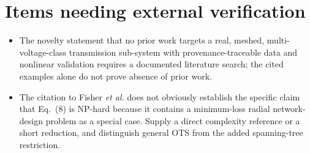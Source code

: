 \documentclass[11pt]{article}
\begin{document}
\section*{Items needing external verification}

\begin{itemize}
  \item The novelty statement that no prior work targets a real, meshed,
  multi-voltage-class transmission sub-system with provenance-traceable data
  and nonlinear validation requires a documented literature search; the cited
  examples alone do not prove absence of prior work.
  \item The citation to Fisher \emph{et al.} does not obviously establish the
  specific claim that Eq.~(8) is NP-hard because it contains a
  minimum-loss radial network-design problem as a special case.  Supply a
  direct complexity reference or a short reduction, and distinguish general
  OTS from the added spanning-tree restriction.
\end{itemize}
\end{document}
